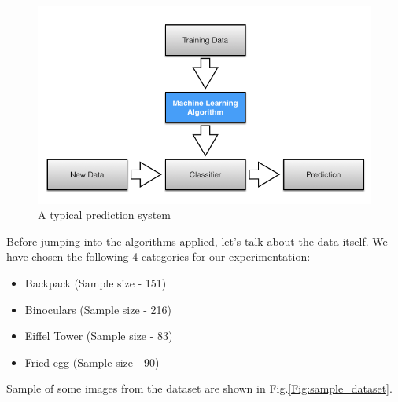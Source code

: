 \documentclass{article} %
\begin{document}
\begin{figure}[h]
\centering
\includegraphics[scale=0.3]{learning_algorithm_basic.png}
\caption{A typical prediction system}
\label{fig:basic_system}
\end{figure}

Before jumping into the algorithms applied, let's talk about the data itself. We have chosen the following 4 categories for our experimentation:
\begin{itemize} 

\item
Backpack (Sample size - 151)
\item
Binoculars (Sample size - 216)
\item
Eiffel Tower (Sample size - 83)
\item
Fried egg (Sample size - 90)

\end{itemize}

Sample of some images from the dataset are shown in Fig.\ref{Fig:sample_dataset}.
\end{document}
